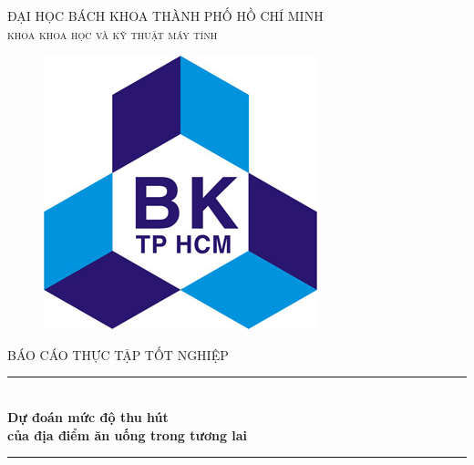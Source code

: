 \documentclass[12pt]{extarticle}
\begin{document}
\begin{titlepage}

\newcommand{\HRule}{\rule{\linewidth}{0.5mm}} %

\center %
 
\begin{flushright}
\begin{minipage}{1\textwidth}

\end{minipage}
\end{flushright}
\textsc{\large ĐẠI HỌC BÁCH KHOA THÀNH PHỐ HỒ CHÍ MINH}\\[0.2cm] %
\textsc{\Large \scshape khoa khoa học và kỹ thuật máy tính}\\[0.5cm] %
\begin{figure}[H] 
\centering
\includegraphics[scale=2]{images/logo.jpg}
\end{figure} 

\textsc{\large BÁO CÁO THỰC TẬP TỐT NGHIỆP}\\[0.2cm] %

\HRule \\[0.4cm]
{ \huge \bfseries Dự đoán mức độ thu hút\\của địa điểm ăn uống trong tương lai}\\[0.4cm] %
\HRule \\[0.8cm]


\end{titlepage}
\end{document}
